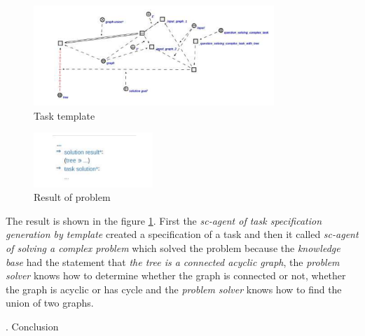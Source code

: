 \documentclass[10pt, a4paper]{article}
\newcommand{\RomanNumeralCaps}[1]{\MakeUppercase{\romannumeral#1}}
\begin{document}
\setcounter{figure}{9}
\setcounter{page}{228}
\begin{multicols}{2}
\begin{figure}[H]
    \centering
   \includegraphics[width=\linewidth]{1screen.png}
    \caption{Task template}
\end{figure}
\vspace{4mm}
\begin{figure}[H]
    \centering
    \includegraphics[width=0.4\textwidth]{2screen.png}
    \caption{Result of problem \label{11}}
\end{figure}
\vspace{9mm}
\par The result is shown in the figure \ref{11}. First the \textit{sc-agent of task specification generation by template} created a specification of a task and then it called \textit{sc-agent of solving a complex problem} which solved the problem because the \textit{knowledge base} had the statement that \textit{the tree is a connected acyclic graph}, the \textit{problem solver} knows how to determine whether the graph is connected or not, whether the graph is acyclic or has cycle and the \textit{problem solver} knows how to find the union of two graphs.
\begin{center}
   \RomanNumeralCaps{7.} Conclusion
\end{center}

\end{multicols}
\end{document}
